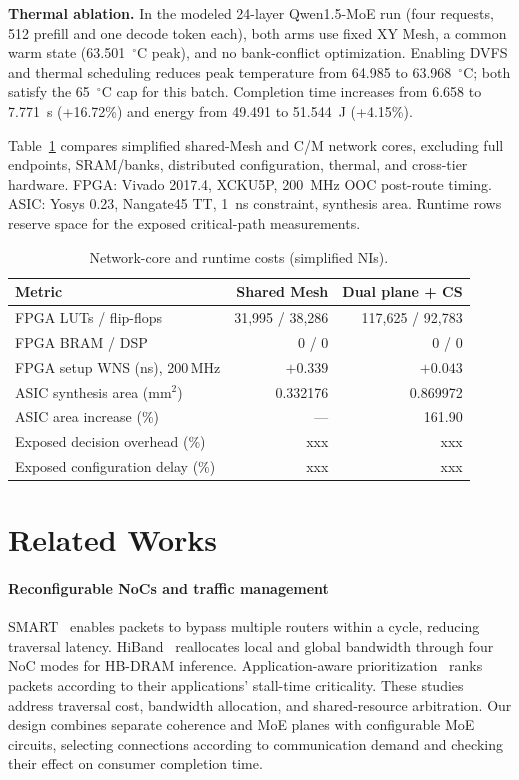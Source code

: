 \documentclass[conference,10pt]{IEEEtran}
\begin{document}
\noindent\textbf{Thermal ablation.}
In the modeled 24-layer Qwen1.5-MoE run (four requests, 512 prefill and
one decode token each), both arms use fixed XY Mesh, a common warm state
(63.501~$^{\circ}$C peak), and no bank-conflict optimization. Enabling DVFS
and thermal scheduling reduces peak temperature from 64.985 to
63.968~$^{\circ}$C; both satisfy the 65~$^{\circ}$C cap for this batch.
Completion time increases from 6.658 to 7.771~s (+16.72\%) and energy
from 49.491 to 51.544~J (+4.15\%).

Table~\ref{tab:eval-cost} compares simplified shared-Mesh and C/M network
cores, excluding full endpoints, SRAM/banks, distributed configuration,
thermal, and cross-tier hardware. FPGA: Vivado 2017.4, XCKU5P, 200~MHz
OOC post-route timing. ASIC: Yosys 0.23, Nangate45 TT, 1~ns constraint,
synthesis area. Runtime rows reserve space for the exposed critical-path measurements.

\begin{table}[!ht]
\caption{Network-core and runtime costs (simplified NIs).}
\label{tab:eval-cost}
\centering\scriptsize
\renewcommand{\arraystretch}{0.85}
\begin{tabularx}{\columnwidth}{@{}>{\raggedright\arraybackslash}Xrr@{}}
\hline
Metric & Shared Mesh & Dual plane + CS \\
\hline
FPGA LUTs / flip-flops & 31,995 / 38,286 & 117,625 / 92,783 \\
FPGA BRAM / DSP & 0 / 0 & 0 / 0 \\
FPGA setup WNS (ns), 200\,MHz & $+0.339$ & $+0.043$ \\
ASIC synthesis area (mm$^2$) & 0.332176 & 0.869972 \\
ASIC area increase (\%) & --- & 161.90 \\
\hline
Exposed decision overhead (\%) & xxx & xxx \\
Exposed configuration delay (\%) & xxx & xxx \\
\hline
\end{tabularx}
\end{table}

\FloatBarrier

\section{Related Works}
\label{sec:related-works}

\paragraph{Reconfigurable NoCs and traffic management}
SMART~\cite{krishna2013smart} enables packets to bypass multiple routers
within a cycle, reducing traversal latency. HiBand~\cite{wang2026hiband}
reallocates local and global bandwidth through four NoC modes for
HB-DRAM inference. Application-aware prioritization~\cite{das2009priority}
ranks packets according to their applications' stall-time criticality.
These studies address traversal cost, bandwidth allocation, and
shared-resource arbitration. Our design combines separate coherence and
MoE planes with configurable MoE circuits, selecting connections according
to communication demand and checking their effect on consumer completion time.
\end{document}
